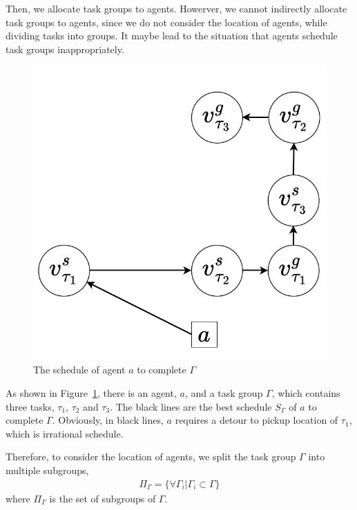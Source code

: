 \documentclass[sigconf,anonymous]{aamas}
\begin{document}

Then, we allocate task groups to agents.
Howerver, we cannot indirectly allocate task groups to agents,
since we do not consider the location of agents, while dividing tasks into groups.
It maybe lead to the situation that agents schedule task groups inappropriately.

\begin{figure}[ht]
  \centering
  \includegraphics[width=0.3\linewidth]{Fig/A-TG.pdf}
  \caption{The schedule of agent $a$ to complete $\Gamma$}
  \label{fig:agent-taskgroup}
\end{figure}

\begin{example}

  As shown in Figure~\ref{fig:agent-taskgroup},
  there is an agent, $a$, and a task group $\Gamma$, which contains three tasks, $\tau_{1}$, $\tau_{2}$ and $\tau_{3}$.
  The black lines are the best schedule $S_\Gamma$ of $a$ to complete $\Gamma$.
  Obviously, in black lines, $a$ requires a detour to pickup location of $\tau_{1}$,
  which is irrational schedule.
  

\end{example}

Therefore, to consider the location of agents,
we split the task group $\Gamma$ into multiple subgroups,
\begin{eqnarray}
  \label{eq:split}
  \Pi_{\Gamma} = \{ \forall \Gamma_i | \Gamma_i \subset \Gamma \}
\end{eqnarray}
where $\Pi_{\Gamma}$ is the set of subgroups of $\Gamma$.
\end{document}
